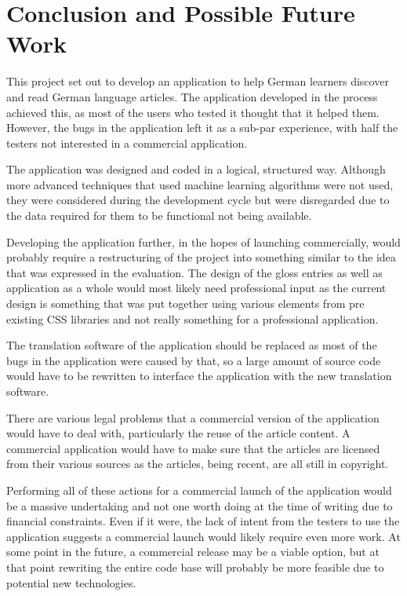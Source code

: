 \chapter{Conclusion and Possible Future Work}

This project set out to develop an application to help German learners discover and read German language articles. The application developed in the process achieved this, as most of the users who tested it thought that it helped them. However, the bugs in the application left it as a sub-par experience, with half the testers not interested in a commercial application. 

The application was designed and coded in a logical, structured way. Although more advanced techniques that used machine learning algorithms were not used, they were considered during the development cycle but were disregarded due to the data required for them to be functional not being available.

Developing the application further, in the hopes of launching commercially, would probably require a restructuring  of the project into something similar to the idea that was expressed in the evaluation. The design of the gloss entries as well as application as a whole would most likely need professional input as the current design is something that was put together using various elements from pre existing CSS libraries and not really something for a professional application.

The translation software of the application should be replaced as most of the bugs in the application were caused by that, so a large amount of source code would have to be rewritten to interface the application with the new translation software.

There are various legal problems that a commercial version of the application would have to deal with, particularly the reuse of the article content. A commercial application would have to make sure that the articles are licensed from their various sources as the articles, being recent, are all still in copyright.

Performing all of these actions for a commercial launch of the application would be a massive undertaking and not one worth doing at the time of writing due to financial constraints. Even if it were, the lack of intent from the testers to use the application suggests a commercial launch would likely require even more work. At some point in the future, a commercial release may be a viable option, but at that point rewriting the entire code base will probably be more feasible due to potential new technologies. 